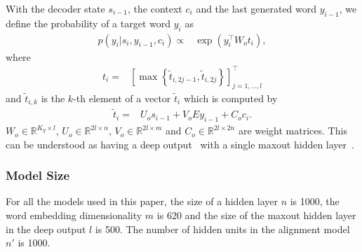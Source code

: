 \documentclass{article} %
\begin{document}
With the decoder state $s_{i-1}$, the context $c_{i}$ and the last generated word
$y_{i-1}$, we define the probability of a target word $y_{i}$ as
\begin{align*}
    p(y_{i}|s_i,y_{i-1},c_{i}) \propto& \exp\left(y_{i}^{\top} W_o t_{i}\right),
\end{align*}
where
\begin{align*}
    t_i =&  \left[ \max\left\{\tilde{t}_{i, 2j-1}, \tilde{t}_{i,2j}\right\}
    \right]_{j=1,\ldots,l}^{\top}
\end{align*}
and $\tilde{t}_{i,k}$ is the $k$-th element of a vector $\tilde{t}_i$ which is
computed by
\begin{align*}
    \tilde{t}_{i} =& U_o s_{i - 1} + V_o E y_{i-1} + C_o c_i.
\end{align*}
$W_o \in \mathbb{R}^{K_y\times  l}$, $U_o \in \mathbb{R}^{2l\times n}$, $V_o \in
\mathbb{R}^{2l\times m}$ and $C_o \in \mathbb{R}^{2l\times 2n}$ are weight
matrices. This can be understood as having a deep output~\citep{Pascanu2014rec}
with a single maxout hidden layer~\citep{Goodfellow2013}.

\subsubsection{Model Size}

For all the models used in this paper, the size of a hidden layer $n$ is 1000,
the word embedding dimensionality $m$ is 620 and the size of the maxout hidden
layer in the deep output $l$ is 500. The number of hidden units in the alignment
model $n'$ is 1000.
\end{document}
